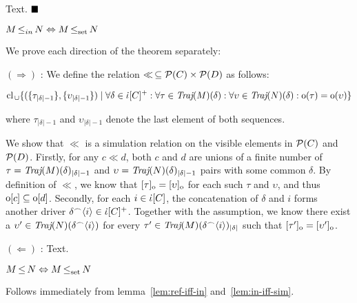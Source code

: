 Text. $\Qed$

\begin{lemma} \label{lem:in-iff-sim}
$M \operatorname{\leq}_{in} N \Leftrightarrow M \operatorname{\operatorname{\leq}_{\textrm{set}}} N$
\end{lemma}

We prove each direction of the theorem separately:

$(\Rightarrow)$ : We define the relation $\ll \, \subseteq \mathcal{P}(C) \times \mathcal{P}(D)$ as follows:

\begin{equation*}
\textrm{cl}_{\, \cup} \{ ( \{ \tau_{| \delta | - 1} \} , \{ \upsilon_{| \delta | - 1} \} ) \mid \forall \delta \in \dot{\iota}[C]^{+} : \forall \tau \in \operatorname{\textit{Traj}}(M)(\delta) : \forall \upsilon \in \operatorname{\textit{Traj}}(N)(\delta) : \mathrm{o}(\tau) = \mathrm{o}(\upsilon) \}
\end{equation*}

\noindent where $\tau_{| \delta | - 1}$ and $\upsilon_{| \delta | - 1}$ denote the last element of both sequences.

We show that $\ll$ is a simulation relation on the visible elements in $\mathcal{P}(C)$ and $\mathcal{P}(D)$. Firstly, for any $c \ll d$, both $c$ and $d$ are unions of a finite number of $\tau = \operatorname{\textit{Traj}}(M)(\delta)_{| \delta | - 1}$ and $\upsilon = \operatorname{\textit{Traj}}(N)(\delta)_{| \delta | - 1}$ pairs with some common $\delta$. By definition of $\ll$, we know that $[\tau]_{\mathrm{o}} = [\upsilon]_{\mathrm{o}}$ for each such $\tau$ and $\upsilon$, and thus $\mathrm{o}[c] \subseteq \mathrm{o}[d]$. Secondly, for each $i \in \dot{\iota}[C]$, the concatenation of $\delta$ and $i$ forms another driver $\delta^{\frown} \langle i \rangle \in \dot{\iota}[C]^{+}$. Together with the assumption, we know there exist a $\upsilon' \in \operatorname{\textit{Traj}}(N)(\delta^{\frown} \langle i \rangle)$ for every $\tau' \in \operatorname{\textit{Traj}}(M)(\delta^{\frown} \langle i \rangle)_{| \delta |}$ such that $[\tau']_{\mathrm{o}} = [\upsilon']_{\mathrm{o}}$.


$(\Leftarrow)$ : Text.

\begin{corollary}
$M \operatorname{\leq} N \Leftrightarrow M \operatorname{\operatorname{\leq}_{\textrm{set}}} N$
\end{corollary}

Follows immediately from lemma~\ref{lem:ref-iff-in} and~\ref{lem:in-iff-sim}.
